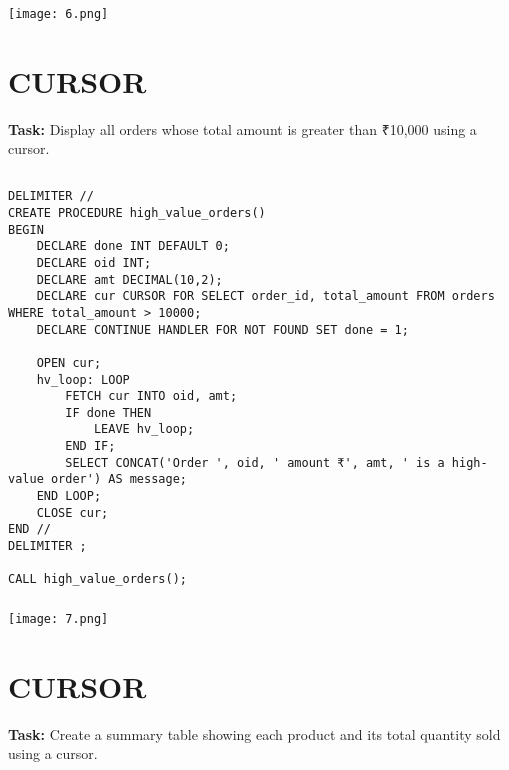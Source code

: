 \documentclass[12pt,a4paper]{article}
\begin{document}
\subsubsection{}
\begin{center}
    \texttt{[image: 6.png]}
\end{center}


\section{CURSOR}
\textbf{Task:} Display all orders whose total amount is greater than ₹10,000 using a cursor.

\subsection{}
\begin{lstlisting}
DELIMITER //
CREATE PROCEDURE high_value_orders()
BEGIN
    DECLARE done INT DEFAULT 0;
    DECLARE oid INT;
    DECLARE amt DECIMAL(10,2);
    DECLARE cur CURSOR FOR SELECT order_id, total_amount FROM orders WHERE total_amount > 10000;
    DECLARE CONTINUE HANDLER FOR NOT FOUND SET done = 1;

    OPEN cur;
    hv_loop: LOOP
        FETCH cur INTO oid, amt;
        IF done THEN
            LEAVE hv_loop;
        END IF;
        SELECT CONCAT('Order ', oid, ' amount ₹', amt, ' is a high-value order') AS message;
    END LOOP;
    CLOSE cur;
END //
DELIMITER ;

CALL high_value_orders();

\end{lstlisting}

\subsubsection{}
\begin{center}
    \texttt{[image: 7.png]}
\end{center}


\section{CURSOR}
\textbf{Task:} Create a summary table showing each product and its total quantity sold using a cursor.
\end{document}
